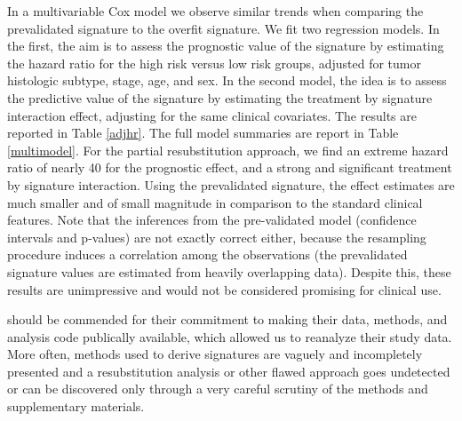 \documentclass[11pt,]{article}
\begin{document}
In a multivariable Cox model we observe similar trends when comparing
the prevalidated signature to the overfit signature. We fit two
regression models. In the first, the aim is to assess the prognostic
value of the signature by estimating the hazard ratio for the high risk
versus low risk groups, adjusted for tumor histologic subtype, stage,
age, and sex. In the second model, the idea is to assess the predictive
value of the signature by estimating the treatment by signature
interaction effect, adjusting for the same clinical covariates. The
results are reported in Table \ref{adjhr}. The full model summaries are
report in Table \ref{multimodel}. For the partial resubstitution
approach, we find an extreme hazard ratio of nearly 40 for the
prognostic effect, and a strong and significant treatment by signature
interaction. Using the prevalidated signature, the effect estimates are
much smaller and of small magnitude in comparison to the standard
clinical features. Note that the inferences from the pre-validated model
(confidence intervals and p-values) are not exactly correct either,
because the resampling procedure induces a correlation among the
observations (the prevalidated signature values are estimated from
heavily overlapping data). Despite this, these results are unimpressive
and would not be considered promising for clinical use.

\citet{zhu2010prognostic} should be commended for their commitment to
making their data, methods, and analysis code publically available,
which allowed us to reanalyze their study data. More often, methods used
to derive signatures are vaguely and incompletely presented and a
resubstitution analysis or other flawed approach goes undetected or can
be discovered only through a very careful scrutiny of the methods and
supplementary materials.
\end{document}
